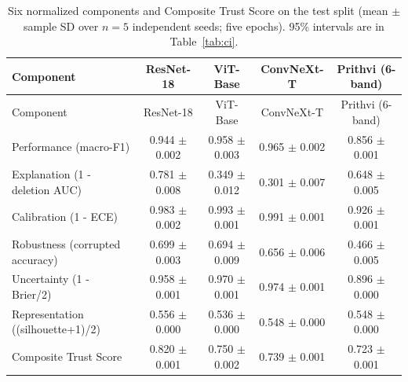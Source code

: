 \begin{longtable}{lcccc}
\caption{Six normalized components and Composite Trust Score on the test split (mean $\pm$ sample SD over $n=5$ independent seeds; five epochs). 95\% intervals are in Table~\ref{tab:ci}.}\label{tab:trust}\\
\toprule Component & ResNet-18 & ViT-Base & ConvNeXt-T & Prithvi (6-band) \\
\midrule\endfirsthead
\toprule Component & ResNet-18 & ViT-Base & ConvNeXt-T & Prithvi (6-band) \\
\midrule\endhead
Performance (macro-F1) & 0.944 $\pm$ 0.002 & 0.958 $\pm$ 0.003 & 0.965 $\pm$ 0.002 & 0.856 $\pm$ 0.001 \\
Explanation (1 - deletion AUC) & 0.781 $\pm$ 0.008 & 0.349 $\pm$ 0.012 & 0.301 $\pm$ 0.007 & 0.648 $\pm$ 0.005 \\
Calibration (1 - ECE) & 0.983 $\pm$ 0.002 & 0.993 $\pm$ 0.001 & 0.991 $\pm$ 0.001 & 0.926 $\pm$ 0.001 \\
Robustness (corrupted accuracy) & 0.699 $\pm$ 0.003 & 0.694 $\pm$ 0.009 & 0.656 $\pm$ 0.006 & 0.466 $\pm$ 0.005 \\
Uncertainty (1 - Brier/2) & 0.958 $\pm$ 0.001 & 0.970 $\pm$ 0.001 & 0.974 $\pm$ 0.001 & 0.896 $\pm$ 0.000 \\
Representation ((silhouette+1)/2) & 0.556 $\pm$ 0.000 & 0.536 $\pm$ 0.000 & 0.548 $\pm$ 0.000 & 0.548 $\pm$ 0.000 \\
Composite Trust Score & 0.820 $\pm$ 0.001 & 0.750 $\pm$ 0.002 & 0.739 $\pm$ 0.001 & 0.723 $\pm$ 0.001 \\
\bottomrule
\end{longtable}
